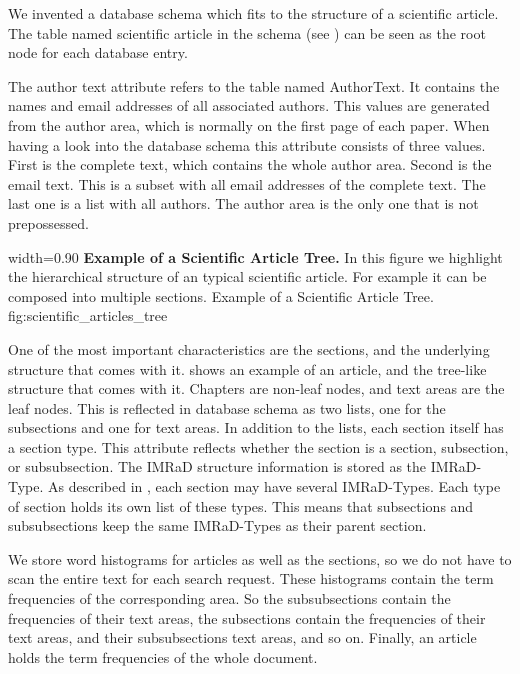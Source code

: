 We invented a database schema which fits to the structure of a scientific article. The table named scientific article in the schema (see ) can be seen as the root node for each database entry.

The author text attribute refers to the table named AuthorText. It contains the names and email addresses of all associated authors. This values are generated from the author area, which is normally on the first page of each paper. When having a look into the database schema this attribute consists of three values. First is the complete text, which contains the whole author area. Second is the email text. This is a subset with all email addresses of the complete text. The last one is a list with all authors. The author area is the only one that is not prepossessed.

      {width=0.90\textwidth}
      {\textbf{Example of a Scientific Article Tree.} In this figure we highlight the hierarchical structure of an typical scientific article. For example it can be composed into multiple sections.}
      {Example of a Scientific Article Tree.}
      {fig:scientific_articles_tree}

One of the most important characteristics are the sections, and the underlying structure that comes with it.  shows an example of an article, and the tree-like structure that comes with it. Chapters are non-leaf nodes, and text areas are the leaf nodes. This is reflected in database schema as two lists, one for the subsections and one for text areas. In addition to the lists, each section itself has a section type. This attribute reflects whether the section is a section, subsection, or subsubsection. The IMRaD structure information is stored as the IMRaD-Type. As described in , each section may have several IMRaD-Types. Each type of section holds its own list of these types. This means that subsections and subsubsections keep the same IMRaD-Types as their parent section.

We store word histograms for articles as well as the sections, so we do not have to scan the entire text for each search request. These histograms contain the term frequencies of the corresponding area. So the subsubsections contain the frequencies of their text areas, the subsections contain the frequencies of their text areas, and their subsubsections text areas, and so on. Finally, an article holds the term frequencies of the whole document.

